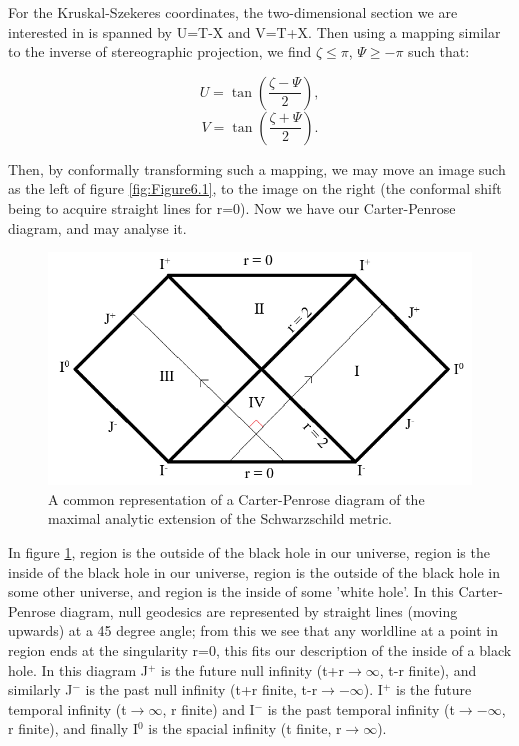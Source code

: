 \documentclass[oneside,openright,frontopenright, singlespacing]{dmathesis}
\begin{document}
	For the Kruskal-Szekeres coordinates, the two-dimensional section we are interested in is spanned by U=T-X and V=T+X. Then using a mapping similar to the inverse of stereographic projection, we find $\zeta\leq\pi$, $\Psi\geq-\pi$ such that:

	\[U = \tan\left(\frac{\zeta-\Psi}{2}\right),\]
	\[V = \tan\left(\frac{\zeta+\Psi}{2}\right).\]

	Then, by conformally transforming such a mapping, we may move an image such as the left of figure \ref{fig:Figure6.1}, to the image on the right (the conformal shift being to acquire straight lines for r=0). Now we have our Carter-Penrose diagram, and may analyse it.

\begin{figure}[!ht]
	\centering
	\includegraphics[width=0.6\linewidth]{img/carter-penrose3}
	\caption{A common representation of a Carter-Penrose diagram of the maximal analytic extension of the Schwarzschild metric.}
	\label{fig:Figure6.2}
\end{figure}

	In figure \ref{fig:Figure6.2}, region  is the outside of the black hole in our universe, region  is the inside of the black hole in our universe, region  is the outside of the black hole in some other universe, and region  is the inside of some 'white hole'. In this Carter-Penrose diagram, null geodesics are represented by straight lines (moving upwards) at a 45 degree angle; from this we see that any worldline at a point in region  ends at the singularity r=0, this fits our description of the inside of a black hole. In this diagram J$^+$ is the future null infinity (t+r$\rightarrow\infty$, t-r finite), and similarly J$^-$ is the past null infinity (t+r finite, t-r$\rightarrow-\infty$). I$^+$ is the future temporal infinity (t$\rightarrow\infty$, r finite) and I$^-$ is the past temporal infinity (t$\rightarrow-\infty$, r finite), and finally I$^0$ is the spacial infinity (t finite, r$\rightarrow\infty$).
\end{document}
